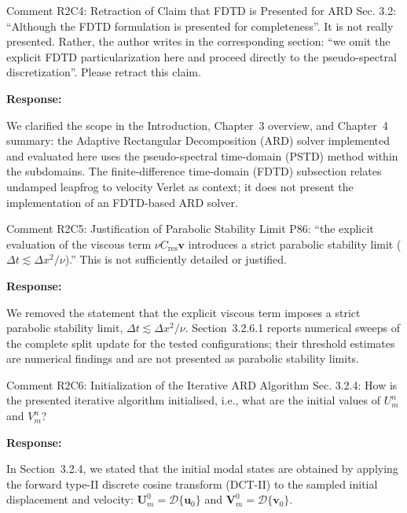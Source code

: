 \documentclass[11pt,a4paper]{article}
\newenvironment{response}{
    \par\vspace{1mm}\noindent\textbf{\textcolor{responseframe}{Response:}}\par\vspace{1mm}
}{
    \par\vspace{3mm}
}
\begin{document}
\begin{revcomment}{Comment R2C4: Retraction of Claim that FDTD is Presented for ARD}
Sec. 3.2: ``Although the FDTD formulation is presented for completeness''. It is not really presented. Rather, the author writes in the corresponding section: ``we omit the explicit FDTD particularization here and proceed directly to the pseudo-spectral discretization''. Please retract this claim.
\end{revcomment}

\begin{response}
We clarified the scope in the Introduction, Chapter~3 overview, and Chapter~4 summary: the Adaptive Rectangular Decomposition (ARD) solver implemented and evaluated here uses the pseudo-spectral time-domain (PSTD) method within the subdomains. The finite-difference time-domain (FDTD) subsection relates undamped leapfrog to velocity Verlet as context; it does not present the implementation of an FDTD-based ARD solver.
\end{response}

\begin{revcomment}{Comment R2C5: Justification of Parabolic Stability Limit}
P86: ``the explicit evaluation of the viscous term $\nu C_{\mathrm{res}}\mathbf v$ introduces a strict parabolic stability limit ($\Delta t \lesssim \Delta x^2/\nu$).'' This is not sufficiently detailed or justified.
\end{revcomment}

\begin{response}
We removed the statement that the explicit viscous term imposes a strict parabolic stability limit, $\Delta t \lesssim \Delta x^2/\nu$. Section~3.2.6.1 reports numerical sweeps of the complete split update for the tested configurations; their threshold estimates are numerical findings and are not presented as parabolic stability limits.
\end{response}

\begin{revcomment}{Comment R2C6: Initialization of the Iterative ARD Algorithm}
Sec. 3.2.4: How is the presented iterative algorithm initialised, i.e., what are the initial values of $U_m^n$ and $V_m^n$?
\end{revcomment}

\begin{response}
In Section~3.2.4, we stated that the initial modal states are obtained by applying the forward type-II discrete cosine transform (DCT-II) \citep{rao_discrete_1990} to the sampled initial displacement and velocity: $\mathbf U_m^0=\mathcal D\{\mathbf u_0\}$ and $\mathbf V_m^0=\mathcal D\{\mathbf v_0\}$.
\end{response}
\end{document}
